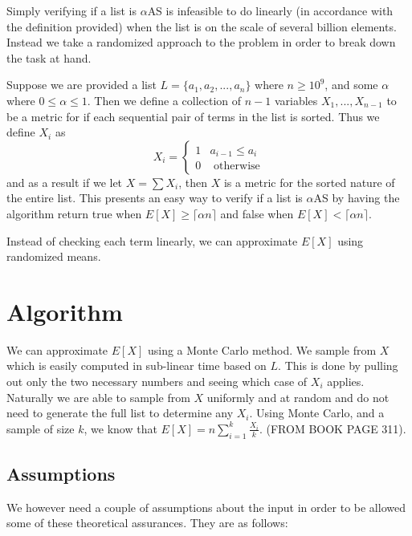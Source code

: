 \documentclass[11pt]{article}
\begin{document}
Simply verifying if a list is $\alpha$AS is infeasible to do linearly (in accordance with the definition provided) when the list is on the scale of several billion elements. Instead we take a randomized approach to the problem in order to break down the task at hand. 

Suppose we are provided a list $L = \{a_1, a_2, ..., a_n\}$ where $n \geq 10^9$, and some $\alpha$ where $0 \leq \alpha \leq 1$. Then we define a collection of $n-1$ variables $X_1, ..., X_{n-1}$ to be a metric for if each sequential pair of terms in the list is sorted. Thus we define $X_i$ as
$$X_i = 
\begin{cases}
	1 & a_{i-1} \leq a_i \\
	0 & \text{ otherwise}
\end{cases}$$
and as a result if we let $X = \sum X_i$, then $X$ is a metric for the sorted nature of the entire list. This presents an easy way to verify if a list is $\alpha$AS by having the algorithm return true when $E[X] \geq \lceil \alpha n \rceil$ and false when $E[X] < \lceil \alpha n \rceil$.

Instead of checking each term linearly, we can approximate $E[X]$ using randomized means. 

\section{Algorithm}

We can approximate $E[X]$ using a Monte Carlo method. We sample from $X$ which is easily computed in sub-linear time based on $L$. This is done by pulling out only the two necessary numbers and seeing which case of $X_i$ applies. Naturally we are able to sample from $X$ uniformly and at random and do not need to generate the full list to determine any $X_i$. Using Monte Carlo, and a sample of size $k$, we know that $E[X] = n \sum\limits^k_{i=1} \frac{X_i}{k}$. (FROM BOOK PAGE 311). 

\subsection{Assumptions}

We however need a couple of assumptions about the input in order to be allowed some of these theoretical assurances. They are as follows:
\end{document}
